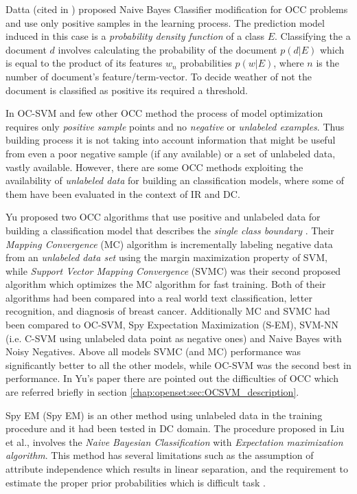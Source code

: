 Datta (cited in \parencite{manevitz2002one}) proposed Naive Bayes Classifier modification for OCC problems and use only positive samples in the learning process. The prediction model induced in this case is a \textit{probability density function} of a class $E$. Classifying the a document $d$ involves calculating the probability of the document $p(d|E)$ which is equal to the product of its features $w_{n}$ probabilities $p(w|E)$, where $n$ is the number of document's feature/term-vector. To decide weather of not the document is classified as positive its required
a threshold. 

In OC-SVM and few other OCC method the process of model optimization requires only \textit{positive sample} points and no \textit{negative} or \textit{unlabeled examples}. Thus building process it is not taking into account information that might be useful from even a poor negative sample (if any available) or a set of unlabeled data, vastly available. However, there are some OCC methods exploiting the availability of \textit{unlabeled data} for building an classification models, where some of them have been evaluated in the context of IR and DC. 

Yu proposed two OCC algorithms that use positive and unlabeled data for building a classification model that describes the \textit{single class boundary} \parencite{yu2005single}. Their \textit{Mapping Convergence }(MC) algorithm is incrementally labeling negative data from an \textit{unlabeled data set} using the margin maximization property of SVM, while \textit{Support Vector Mapping Convergence} (SVMC) was their second proposed algorithm which optimizes the MC algorithm for fast training. Both of their algorithms had been compared into a real world text classification, letter recognition, and diagnosis of breast cancer. Additionally MC and SVMC had been compared to OC-SVM, Spy Expectation Maximization (S-EM), SVM-NN (i.e. C-SVM using unlabeled data point as negative ones) and Naive Bayes with Noisy Negatives. Above all models SVMC (and MC) performance was significantly better to all the other models, while OC-SVM was the second best in performance. In Yu's paper there are pointed out the difficulties of OCC which are referred briefly in section \ref{chap:openset:sec:OCSVM_description}.

Spy EM (Spy EM) is an other method using unlabeled data in the training procedure and it had been tested in DC domain. The procedure proposed in Liu et al.\parencite{liu2002partially}, involves the \textit{Naive Bayesian Classification} with \textit{Expectation maximization algorithm}. This method has several limitations such as the assumption of attribute independence which results in linear separation, and the requirement to estimate the proper prior probabilities which is difficult task \parencite{yu2005single}.

